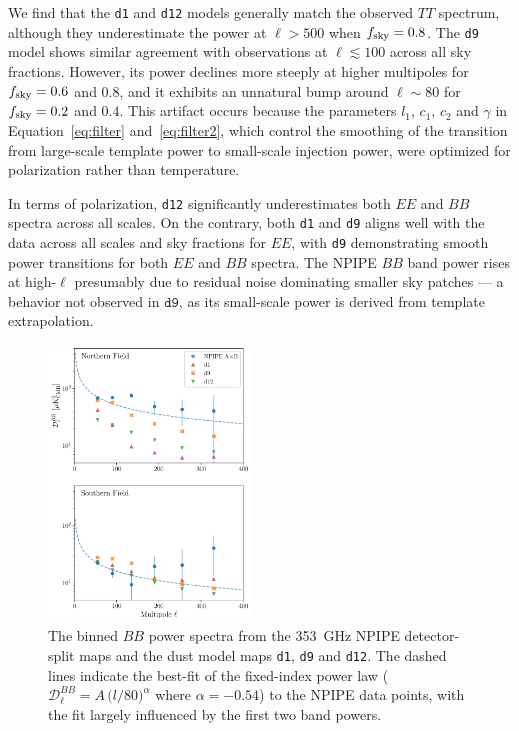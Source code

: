 \documentclass[twocolumn]{aastex631}
\begin{document}
We find that the \texttt{d1} and \texttt{d12} models generally match the observed $TT$ spectrum, although they underestimate the power at $\ell > 500$ when $f_{\rm sky} = 0.8$. The \texttt{d9} model shows similar agreement with observations at $\ell \lesssim 100$ across all sky fractions. However, its power declines more steeply at higher multipoles for $f_{\rm sky} = 0.6$ and $0.8$, and it exhibits an unnatural bump around $\ell \sim 80$ for $f_{\rm sky} = 0.2$ and $0.4$. This artifact occurs because the parameters $l_1$, $c_1$, $c_2$ and $\gamma$ in Equation~\ref{eq:filter} and~\ref{eq:filter2}, which control the smoothing of the transition from large-scale template power to small-scale injection power, were optimized for polarization rather than temperature. 

In terms of polarization, \texttt{d12} significantly underestimates both $EE$ and $BB$ spectra across all scales. On the contrary, both \texttt{d1} and \texttt{d9} aligns well with the data across all scales and sky fractions for $EE$, with \texttt{d9} demonstrating smooth power transitions for both $EE$ and $BB$ spectra. The NPIPE $BB$ band power rises at high-$\ell$ presumably due to residual noise dominating smaller sky patches --- a behavior not observed in $\texttt{d9}$, as its small-scale power is derived from template extrapolation. 

\begin{figure}
    \centering
    \includegraphics[width=0.48\textwidth]{figures/smallfield_power.pdf}
    \caption{The binned $BB$ power spectra from the 353~GHz NPIPE detector-split maps and the dust model maps \texttt{d1}, \texttt{d9} and \texttt{d12}. The dashed lines indicate the best-fit of the fixed-index power law ($\mathcal{D}_\ell^{BB} = A \, \big( l/80 \big)^{\alpha}$ where $\alpha = -0.54$) to the NPIPE data points, with the fit largely influenced by the first two band powers.}
    \label{fig:smallfield_power}
\end{figure}
\end{document}

